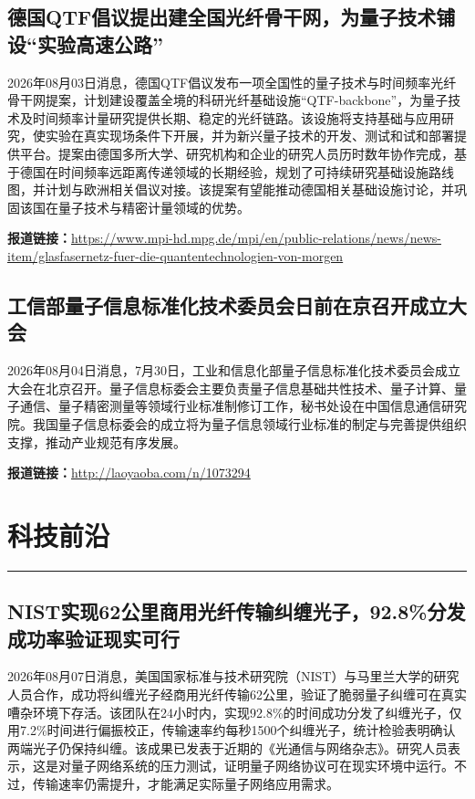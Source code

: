 \documentclass[12pt,a4paper]{ctexart}
\begin{document}
\subsection{ 德国QTF倡议提出建全国光纤骨干网，为量子技术铺设“实验高速公路” }

2026年08月03日消息，德国QTF倡议发布一项全国性的量子技术与时间频率光纤骨干网提案，计划建设覆盖全境的科研光纤基础设施“QTF-backbone”，为量子技术及时间频率计量研究提供长期、稳定的光纤链路。该设施将支持基础与应用研究，使实验在真实现场条件下开展，并为新兴量子技术的开发、测试和试和部署提供平台。提案由德国多所大学、研究机构和企业的研究人员历时数年协作完成，基于德国在时间频率远距离传递领域的长期经验，规划了可持续研究基础设施路线图，并计划与欧洲相关倡议对接。该提案有望能推动德国相关基础设施讨论，并巩固该国在量子技术与精密计量领域的优势。

\noindent\textbf{报道链接：}\url{https://www.mpi-hd.mpg.de/mpi/en/public-relations/news/news-item/glasfasernetz-fuer-die-quantentechnologien-von-morgen}

\subsection{ 工信部量子信息标准化技术委员会日前在京召开成立大会 }

2026年08月04日消息，7月30日，工业和信息化部量子信息标准化技术委员会成立大会在北京召开。量子信息标委会主要负责量子信息基础共性技术、量子计算、量子通信、量子精密测量等领域行业标准制修订工作，秘书处设在中国信息通信研究院。我国量子信息标委会的成立将为量子信息领域行业标准的制定与完善提供组织支撑，推动产业规范有序发展。

\noindent\textbf{报道链接：}\url{http://laoyaoba.com/n/1073294}


\newpage
\section{科技前沿}
\vspace{-0.5em}
\noindent\rule{\linewidth}{1.5pt}

\subsection{ NIST实现62公里商用光纤传输纠缠光子，92.8\%分发成功率验证现实可行 }

2026年08月07日消息，美国国家标准与技术研究院（NIST）与马里兰大学的研究人员合作，成功将纠缠光子经商用光纤传输62公里，验证了脆弱量子纠缠可在真实嘈杂环境下存活。该团队在24小时内，实现92.8\%的时间成功分发了纠缠光子，仅用7.2\%时间进行偏振校正，传输速率约每秒1500个纠缠光子，统计检验表明确认两端光子仍保持纠缠。该成果已发表于近期的《光通信与网络杂志》。研究人员表示，这是对量子网络系统的压力测试，证明量子网络协议可在现实环境中运行。不过，传输速率仍需提升，才能满足实际量子网络应用需求。
\end{document}
